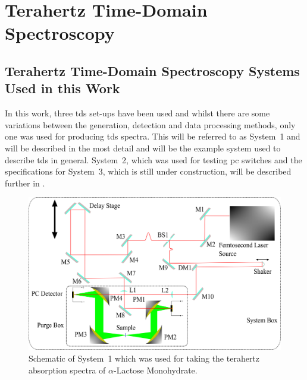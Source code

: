 \section{Terahertz Time-Domain Spectroscopy}
\subsection{Terahertz Time-Domain Spectroscopy Systems Used in this Work}
\label{subsec:tdssystems}
In this work, three \acrshort{tds} set\nobreakdash-ups have been used and whilst there are some variations between the generation, detection and data processing methods, only one was used for producing \acrshort{tds} spectra. This will be referred to as System~1 and will be described in the most detail and will be the example system used to describe \acrshort{tds} in general. System~2, which was used for testing \acrshort{pc} switches and the specifications for System~3, which is still under construction, will be described further in .

\begin{figure}[h]
\centering
\includegraphics[scale=0.6]{Figures/Systems/EE_BBTHzTDS_V7.png}
\captionsetup{font = footnotesize, justification = centering}
  \caption[Schematic of System~1 which was used for taking the Terahertz Absorption Spectra of \(\alpha\)-Lactose Monohydrate]{Schematic of System~1 which was used for taking the terahertz absorption spectra of \(\alpha\)-Lactose Monohydrate.}
  \label{fig:BBTDS System}
\end{figure}

